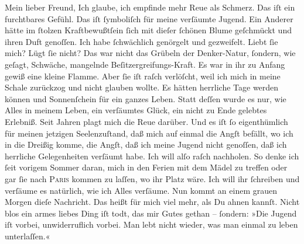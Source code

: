 \pstart\center{}Mein lieber Freund,\pend\vspace{0.5em}
\pstart
           Ich glaube, ich empfinde mehr Reue als Schmerz. Das iſt ein furchtbares Gefühl. Das
                  \label{K_L02628-1v}\label{K_L02628-1} iſt{ }ſymboliſch für meine verſäumte Jugend. Ein
               Anderer hätte im{ }ſtolzen Kraftbewußtſein{ }ſich mit dieſer{ }ſchönen Blume geſchmückt und ihren Duft genoſſen. Ich
               habe{ }ſchwächlich genörgelt und gezweifelt. Liebt{ }ſie mich? Lügt{ }ſie nicht? Das war
               nicht das Grübeln der Denker-Natur,{ }ſondern, wie geſagt, Schwäche, mangelnde
               Beſitzergreifungs-Kraft. Es war in ihr zu Anfang gewiß eine kleine Flamme. Aber{ }ſie
               iſt {\pb}raſch verlöſcht, weil ich mich in meine Schale
               zurückzog und nicht glauben wollte. Es hätten herrliche Tage werden können und
               Sonnenſchein für ein ganzes Leben. Statt deſſen wurde es nur, wie Alles in meinem
               Leben, ein verſäumtes Glück, ein nicht zu Ende gelebtes Erlebniß. Seit Jahren plagt
               mich die Reue darüber. Und es iſt{ }ſo eigenthümlich für meinen jetzigen Seelenzuſtand,
               daß mich auf einmal die Angſt befällt, wo ich in die Dreißig komme, die Angſt, daß
               ich \strikeout{\textcolor{gray}{d}} meine Jugend nicht genoſſen, daß ich herrliche Gelegenheiten verſäumt habe.
               Ich will alſo raſch nachholen. So denke ich{ }ſeit vorigem Sommer daran, mich in den
               Ferien {\pb}mit dem Mädel zu treffen oder gar{ }ſie nach \textsc{Paris} kommen zu laſſen, wo ihr Platz wäre. Ich will ihr{ }ſchreiben und verſäume es
               natürlich, wie ich Alles verſäume. Nun kommt an einem grauen Morgen dieſe Nachricht.
               Das heißt für mich viel mehr, als Du ahnen kannſt. Nicht blos ein armes liebes Ding iſt todt, das mir Gutes
               gethan –{ }ſondern: »Die Jugend iſt vorbei, unwiderruflich vorbei. Man lebt nicht
               wieder, was man einmal zu leben unterlaſſen.«\pend
           
